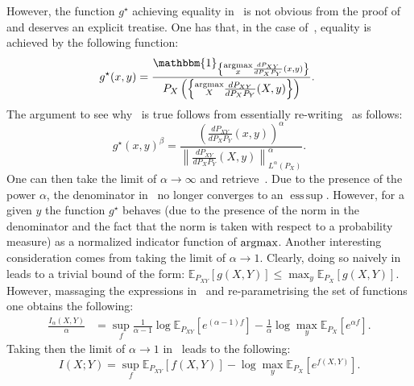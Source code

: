 \documentclass{article}
\numberwithin{theorem}{section}
\numberwithin{example}{section}
\numberwithin{remark}{section}
\numberwithin{definition}{section}
\newcommand{\E}{\mathbb{E}}
\DeclareMathOperator*{\esssup}{ess\,sup}
\newcommand{\argmax}{\operatornamewithlimits{argmax}}
\newcommand{\revised}[1]{{\color{black} #1}}
\begin{document}
However, the function $g^\star$ achieving equality in~ is not obvious from the proof of~ and deserves an explicit treatise. One has that, in the case of~, equality is achieved by the following function:
\begin{equation}
g^\star(x,y) = \frac{\mathbbm{1}_{\left\{\substack{\text{argmax}\\ x}{\frac{dP_{XY}}{dP_XP_Y}(x,y)}\right\}}}{P_X\left(\left\{\substack{\text{argmax}\\ X}{\frac{dP_{XY}}{dP_XP_Y}(X ,y)}\right\}\right)}.~\label{eq:equalityML} 
\end{equation}
The argument to see why~ is true follows from essentially re-writing~ as follows:
\begin{equation}
    g^\star(x,y)^\beta = \frac{\left(\frac{dP_{XY}}{dP_XP_Y}(x,y)\right)^\alpha}{\left\lVert\frac{dP_{XY}}{dP_XP_Y}(X,y)\right\rVert^\alpha _{L^\alpha(P_X)} }.\label{eq:equalityIalpha2}
\end{equation}
One can then take the limit of $\alpha\to\infty$ and retrieve~. Due to the presence of the power $\alpha$, the denominator in~ no longer converges to an $\esssup$. However, for a given $y$ the function $g^\star$ behaves (due to the presence of the norm in the denominator and the fact that the norm is taken with respect to a probability measure) \revised{as a normalized indicator function of $\argmax$}. 
Another interesting consideration comes from taking the limit of $\alpha\to 1$. Clearly, doing so naively in~ leads to a trivial bound of the form: $\E_{P_{XY}}[g(X,Y)]\leq \max_y \E_{P_X}[g(X,Y)]$. However, massaging the expressions in~ and re-parametrising the set of functions one obtains the following:
\begin{equation}
    \begin{split}
        \frac{I_\alpha(X,Y)}{\alpha} &= \sup_{f} \frac{1}{\alpha-1}\log \E_{P_{XY}}\left[e^{(\alpha-1)f}\right]- \frac1\alpha \log \max_y \E_{P_X}\left[e^{\alpha f}\right]. \label{eq:varReprIalpha2}
    \end{split}
\end{equation}
Taking then the limit of $\alpha\to 1$ in~ leads to the following:
\begin{equation}
        I(X;Y) = \sup_{f} \E_{P_{XY}}\left[f(X,Y) \right] - \log \max_y \E_{P_X}\left[e^{f(X,Y)}\right]. \label{eq:varReprMI}
\end{equation}
\end{document}

